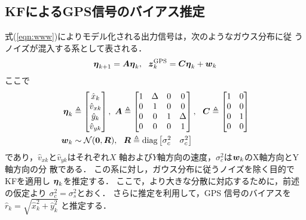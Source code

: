 \documentclass[a4paper,10pt,twocolumn,fleqn]{jsarticle}
\def\vec#1{\mbox{\boldmath$#1$}}
\def\vec#1{\mbox{\boldmath$#1$}}
\begin{document}
\subsection{KFによるGPS信号のバイアス推定}
\vspace{-2mm}
式(\ref{eqn:www})によりモデル化される出力信号は，次のようなガウス分布に従
うノイズが混入する系として表される．
\begin{align}
 \vec{\eta}_{k+1}=\vec{A}\vec{\eta}_{k},\ \
 \vec{z}^{\text{GPS}}_{k}=\vec{C}\vec{\eta}_{k}+\vec{w}_k
\end{align}
ここで
\begin{align*}
 \vec{\eta}_k &\triangleq 
 \left[
 \begin{matrix}
  \hat{x}_k \\ \hat{v}_{xk} \\
  \hat{y}_k \\ \hat{v}_{yk}
 \end{matrix}
 \right],\ 
%
 \vec{A} \triangleq 
 \left[
 \begin{matrix}
  1 & \Delta & 0 & 0\\
  0 & 1 & 0 & 0\\
  0 & 0 & 1 & \Delta\\
  0 & 0 & 0 & 1 
 \end{matrix}
 \right],\ \ 
 \vec{C} \triangleq 
 \left[
 \begin{matrix}
  1 & 0 \\ 0 & 0 \\  0 & 1\\  0 & 0
 \end{matrix}
 \right]\\
 \vec{w}_k  &\sim \mathcal{N}(\vec{0},\vec{R}),\ \
%
\vec{R} \triangleq  
 \text{diag}\left[
 \begin{matrix}
  \sigma^2_c & \sigma^2_c 
 \end{matrix}
 \right]
\end{align*}
であり，$\hat{v}_{xk}$と$\hat{v}_{yk}$はそれぞれ$X$
軸および$Y$軸方向の速度，$\sigma^2_c$は$\vec{w}_k$のX軸方向とY軸方向の分
散である．
この系に対し，ガウス分布に従うノイズを除く目的でKFを適用し
$\vec{\eta}_k$を推定する．
ここで，より大きな分散に対応するために，前述の仮定より
$\sigma_c^2=\sigma_s^2$とおく．
%
さらに推定を利用して，GPS
信号のバイアスを
$
\hat{r}_k=\sqrt{\hat{x}_k^2+\hat{y}_k^ 2}
$
と推定する．
\vspace{-4mm}
\end{document}
